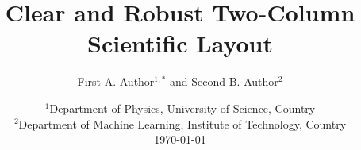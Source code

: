 \title{\bf Clear and Robust Two-Column Scientific Layout}

\author{First A. Author$^{1,*}$ and Second B. Author$^{2}$}

\date{\small $^1$Department of Physics, University of Science, Country\\
$^2$Department of Machine Learning, Institute of Technology, Country\\
\today}
